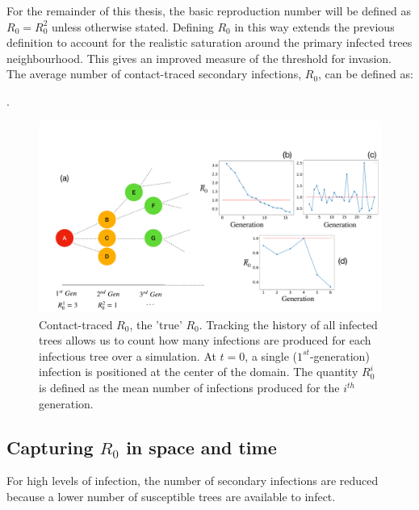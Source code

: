 \begin{fi}
For the remainder of this thesis, the basic reproduction number will be defined as $R_0=R^2_0$ unless otherwise stated. 
Defining $R_0$ in this way extends the previous definition to account for the realistic %
saturation around the primary infected trees neighbourhood. This gives an improved measure %
of the threshold for invasion. The average number of contact-traced secondary infections, $R_0$, can be defined as:
\begin{defn}. %
\label{def:R0_contact_traced}
\end{defn}

\begin{figure}
    \centering
    \includegraphics[scale=0.255]{chapter5/figures/fig1.pdf}
    \caption{Contact-traced $R_0$, the 'true' $R_0$. Tracking the history of all infected trees allows us to count how many infections are produced for each infectious tree over a simulation. At $t=0$, a single ($1^{st}$-generation) infection is positioned at the center of the domain. The quantity $R^i_0$ is defined as the mean number of infections produced for  the $i^{th}$ generation.}
    \label{fig:contact-trace}
\end{figure}


\subsection{Capturing $R_0$ in space and time}

For high levels of infection, the number of secondary infections are reduced because a lower number of susceptible trees are available to infect. 


\end{fi}
